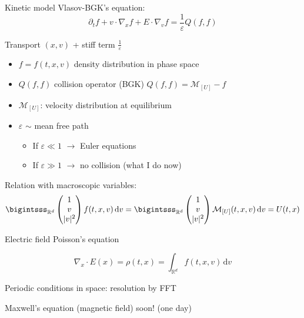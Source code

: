 \documentclass{beamer}
\begin{document}
  \begin{frame}{Kinetic model}
    Vlasov-BGK's equation:
    $$
      \partial_t f + v\cdot\nabla_x f + E\cdot\nabla_v f = \frac{1}{\varepsilon}Q(f,f)
    $$

    Transport $(x,v)$ + stiff term $\frac{1}{\varepsilon}$

    \begin{itemize}
      \item $f = f(t,x,v)$ density distribution in phase space
      \item $Q(f,f)$ collision operator (BGK) $Q(f,f) = \mathcal{M}_{[U]}-f$
      \item $\mathcal{M}_{[U]}$: velocity distribution at equilibrium
      \item $\varepsilon$ $\sim$ mean free path \begin{itemize}
	      \item If $\varepsilon \ll 1$ $\rightarrow$ Euler equations
	      \item If $\varepsilon \gg 1$ $\rightarrow$ no collision (what I do now)
	     \end{itemize}
    \end{itemize}

    Relation with macroscopic variables:
    $$
      \bigintsss_{\mathbb{R}^d} \begin{pmatrix}1 \\ v \\ |v|^2 \end{pmatrix}f(t,x,v)\,\mathrm{d}v =
      \bigintsss_{\mathbb{R}^d} \begin{pmatrix}1 \\ v \\ |v|^2 \end{pmatrix}\mathcal{M}_{[U]}(t,x,v)\,\mathrm{d}v
      = U(t,x)
    $$
  \end{frame}

  \begin{frame}{Electric field}
    Poisson's equation

    $$
      \nabla_x\cdot E (x) = \rho (t,x) = \int_{\mathbb{R}^d} f(t,x,v)\,\mathrm{d}v
    $$

    Periodic conditions in space: resolution by FFT

    Maxwell's equation (magnetic field) soon! (one day)
  \end{frame}
\end{document}
